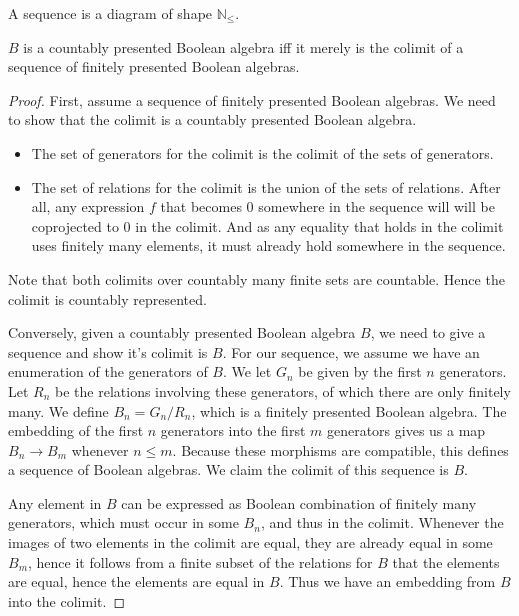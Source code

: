\begin{definition}
  A sequence is a diagram of shape $\mathbb N_{\leq}$.
\end{definition} 

\begin{lemma}
  $B$ is a countably presented Boolean algebra iff 
  it merely is the colimit of a sequence of finitely presented Boolean algebras.%
\end{lemma} 
\begin{proof}
  First, assume a sequence of finitely presented Boolean algebras. 
  We need to show that the colimit is a countably presented Boolean algebra. 
  \begin{itemize}
    \item The set of generators for the colimit is the colimit of the sets of generators. 
    \item The set of relations for the colimit is the union of the sets of relations. 
      After all, any expression $f$ that becomes $0$ somewhere in the sequence will will be coprojected to $0$
      in the colimit. And as any equality that holds in the colimit uses finitely many elements, 
      it must already hold somewhere in the sequence. 
  \end{itemize}
  Note that both colimits over countably many finite sets are countable. 
  Hence the colimit is countably represented. 

  Conversely, given a countably presented Boolean algebra $B$, we need to give a sequence and show it's colimit is $B$. 
  For our sequence, we assume we have an enumeration of the generators of $B$. 
  We let $G_n$ be given by the first $n$ generators. 
  Let $R_n$ be the relations involving these generators, 
  of which there are only finitely many. 
  We define $B_n = G_n/R_n$, which is a finitely presented Boolean algebra. 
  The embedding of the first $n$ generators into the first $m$ generators gives us 
  a map $B_n \to B_m$ whenever $n\leq m$. 
  Because these morphisms are compatible, this defines a sequence of Boolean algebras. 
  We claim the colimit of this sequence is $B$. 

  Any element in $B$ can be expressed as Boolean combination of finitely many generators, 
  which must occur in some $B_n$, and thus in the colimit. 
  Whenever the images of two elements in the colimit are equal, they are already equal in some $B_m$, 
  hence it follows from a finite subset of the relations for $B$ that the elements are equal, 
  hence the elements are equal in $B$. Thus we have an embedding from $B$ into the colimit. 


\end{proof}
